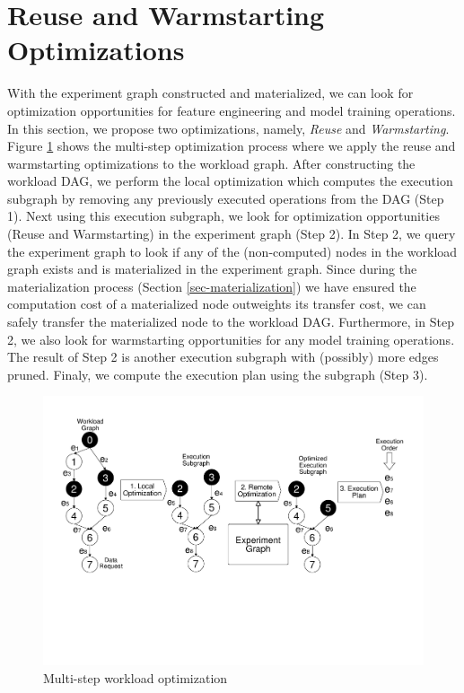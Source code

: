 \section{Reuse and Warmstarting Optimizations}\label{sec-reuse-and-warmstarting}
With the experiment graph constructed and materialized, we can look for optimization opportunities for feature engineering and model training operations.
In this section, we propose two optimizations, namely, \textit{Reuse} and \textit{Warmstarting}.
Figure \ref{remote-optimization} shows the multi-step optimization process where we apply the reuse and warmstarting optimizations to the workload graph.
After constructing the workload DAG, we perform the local optimization which computes the execution subgraph by removing any previously executed operations from the DAG (Step 1).
Next using this execution subgraph, we look for optimization opportunities (Reuse and Warmstarting) in the experiment graph (Step 2).
In Step 2, we query the experiment graph to look if any of the (non-computed) nodes in the workload graph exists and is materialized in the experiment graph.
Since during the materialization process (Section \ref{sec-materialization}) we have ensured the computation cost of a materialized node outweights its transfer cost, we can safely transfer the materialized node to the workload DAG.
Furthermore, in Step 2, we also look for warmstarting opportunities for any model training operations.
The result of Step 2 is another execution subgraph with (possibly) more edges pruned.
Finaly, we compute the execution plan using the subgraph (Step 3).
\begin{figure}
\centering
\includegraphics[width=\columnwidth]{../images/remote-optimization}
\caption{Multi-step workload optimization}
\label{remote-optimization}
\end{figure}

